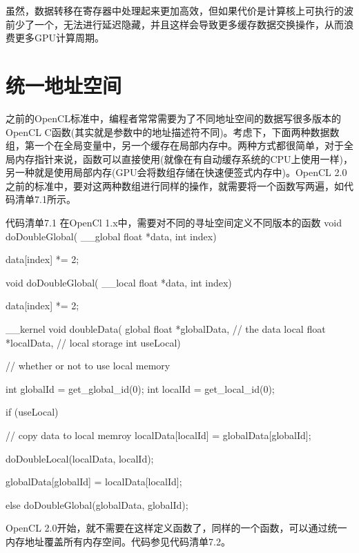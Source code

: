 虽然，数据转移在寄存器中处理起来更加高效，但如果代价是计算核上可执行的波前少了一个，无法进行延迟隐藏，并且这样会导致更多缓存数据交换操作，从而浪费更多GPU计算周期。



\section{统一地址空间}

之前的OpenCL标准中，编程者常常需要为了不同地址空间的数据写很多版本的OpenCL C函数(其实就是参数中的地址描述符不同)。考虑下，下面两种数据数组，第一个在全局变量中，另一个缓存在局部内存中。两种方式都很简单，对于全局内存指针来说，函数可以直接使用(就像在有自动缓存系统的CPU上使用一样)，另一种就是使用局部内存(GPU会将数组存储在快速便签式内存中)。OpenCL 2.0之前的标准中，要对这两种数组进行同样的操作，就需要将一个函数写两遍，如代码清单7.1所示。

\begin{codeboxt}[cpp]{代码清单7.1 在OpenCl 1.x中，需要对不同的寻址空间定义不同版本的函数}
void doDoubleGlobal(
  __global float *data,
  int index){

  data[index] *= 2;
}

void doDoubleGlobal(
  __local float *data,
  int index){

  data[index] *= 2;
}

__kernel
void doubleData(
  global float *globalData, // the data
  local float *localData, // local storage
  int useLocal){ // whether or not to use local memory

  int globalId = get_global_id(0);
  int localId = get_local_id(0);

  if (useLocal){
    // copy data to local memroy
    localData[localId] = globalData[globalId];

    doDoubleLocal(localData, localId);

    globalData[globalId] = localData[localId];
  } else {
    doDoubleGlobal(globalData, globalId);
  }
}
\end{codeboxt}

OpenCL 2.0开始，就不需要在这样定义函数了，同样的一个函数，可以通过统一内存地址覆盖所有内存空间。代码参见代码清单7.2。

